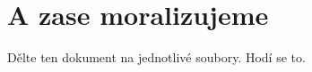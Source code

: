 \section{A zase moralizujeme}
\label{sec:cpc}

Dělte ten dokument na jednotlivé soubory. Hodí se to.
